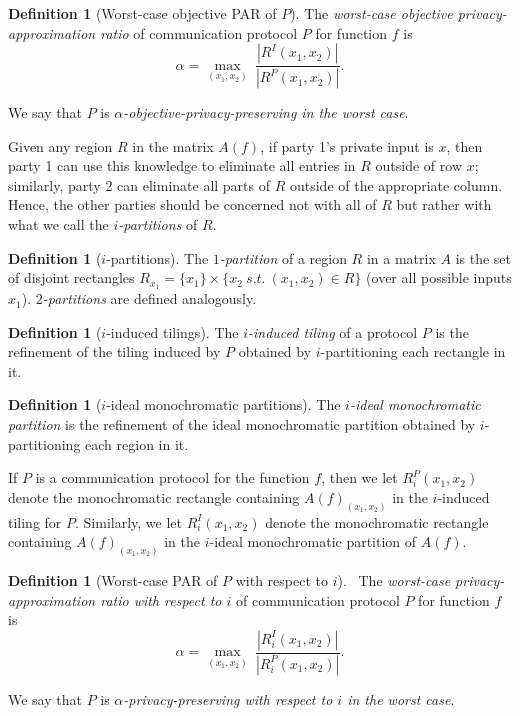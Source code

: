 \documentclass{article}
\theoremstyle{theorem}
\theoremstyle{definition}
\newtheorem{definition}[theorem]{Definition}
\theoremstyle{remark}
\begin{document}
\begin{definition}[Worst-case objective PAR of $P$]
The \emph{worst-case objective privacy-ap\-prox\-i\-ma\-tion ratio} of
communication protocol $P$ for function $f$ is
\[
    \alpha=\max_{(x_1,x_2)}\ \frac{|R^I(x_1,x_2)|}{|R^P(x_1,x_2)|}.
\]

We say that $P$ is \emph{$\alpha$-objective-privacy-preserving in
the worst case}.
\end{definition}

Given any region $R$ in the matrix $A(f)$, if party
1's private input is $x$, then party 1 can use this
knowledge to eliminate all entries in $R$ outside of row $x$; similarly,
party 2 can eliminate all parts of $R$ outside of the appropriate column.
Hence, the other parties should be concerned not with all of $R$ but rather
with what we call the \emph{$i$-partitions} of $R$.

\begin{definition} [$i$-partitions]
The \emph{$1$-partition} of a region $R$ in a matrix $A$ is the set of
disjoint rectangles $R_{x_1}=\{x_1\}\times\{x_2\ s.t.\
(x_1,x_2)\in R\}$ (over all possible inputs $x_1$).
\emph{$2$-partitions} are defined analogously.
\end{definition}

\begin{definition} [$i$-induced tilings]
The \emph{$i$-induced tiling} of a protocol $P$ is the refinement of the
tiling induced by $P$ obtained by $i$-partitioning each rectangle in
it.
\end{definition}

\begin{definition} [$i$-ideal monochromatic partitions]
The \emph{$i$-ideal monochromatic partition} is the refinement of the ideal
monochromatic partition obtained by $i$-partitioning each region in
it.\end{definition}

If $P$ is a communication protocol for the function $f$, then we let
$R_i^P(x_1,x_2)$ denote the monochromatic rectangle containing
$A(f)_{(x_1,x_2)}$ in the $i$-induced tiling for $P$. Similarly, we let
$R_i^I(x_1,x_2)$ denote the monochromatic rectangle containing
$A(f)_{(x_1,x_2)}$ in the $i$-ideal monochromatic partition of
$A(f)$.

\begin{definition}[Worst-case PAR of $P$ with respect to $i$]
\ The \emph{worst-case privacy-ap\-prox\-i\-ma\-tion ratio with respect to
$i$} of communication protocol $P$ for function $f$ is
\[
    \alpha=\max_{(x_1,x_2)}\ \frac{|R_i^I(x_1,x_2)|}{|R^P_i(x_1,x_2)|}.
\]

We say that $P$ is \emph{$\alpha$-privacy-preserving with respect to
$i$ in the worst case}.
\end{definition}
\end{document}
